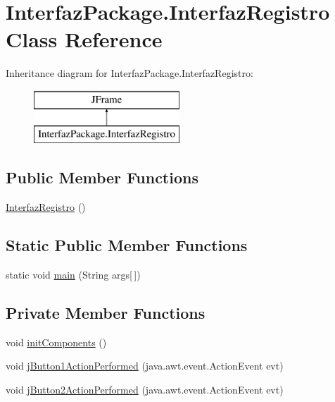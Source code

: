 \hypertarget{class_interfaz_package_1_1_interfaz_registro}{}\section{Interfaz\+Package.\+Interfaz\+Registro Class Reference}
\label{class_interfaz_package_1_1_interfaz_registro}
Inheritance diagram for Interfaz\+Package.\+Interfaz\+Registro\+:\begin{figure}[H]
\begin{center}
\leavevmode
\includegraphics[height=2.000000cm]{class_interfaz_package_1_1_interfaz_registro}
\end{center}
\end{figure}
\subsection*{Public Member Functions}
\begin{DoxyCompactItemize}
\item 
\mbox{\hyperlink{class_interfaz_package_1_1_interfaz_registro_af44bbc6e1ad688d95cff640e7ce5a387}{Interfaz\+Registro}} ()
\end{DoxyCompactItemize}
\subsection*{Static Public Member Functions}
\begin{DoxyCompactItemize}
\item 
static void \mbox{\hyperlink{class_interfaz_package_1_1_interfaz_registro_aa4d128f60566eb1c39f1b68bb2e9a408}{main}} (String args\mbox{[}$\,$\mbox{]})
\end{DoxyCompactItemize}
\subsection*{Private Member Functions}
\begin{DoxyCompactItemize}
\item 
void \mbox{\hyperlink{class_interfaz_package_1_1_interfaz_registro_ac2213b3d60f5dbe3b48030b85807c1ac}{init\+Components}} ()
\item 
void \mbox{\hyperlink{class_interfaz_package_1_1_interfaz_registro_affdd5c6917bc792ac5956b859af09413}{j\+Button1\+Action\+Performed}} (java.\+awt.\+event.\+Action\+Event evt)
\item 
void \mbox{\hyperlink{class_interfaz_package_1_1_interfaz_registro_a030f9895f8648d5c1c85dd7b97ea84fb}{j\+Button2\+Action\+Performed}} (java.\+awt.\+event.\+Action\+Event evt)
\end{DoxyCompactItemize}
